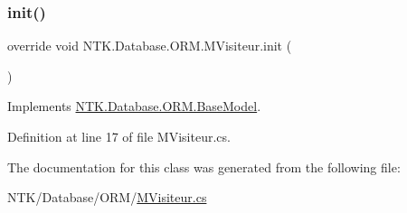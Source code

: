 \subsubsection{\texorpdfstring{init()}{init()}}
{\footnotesize\ttfamily override void N\+T\+K.\+Database.\+O\+R\+M.\+M\+Visiteur.\+init (\begin{DoxyParamCaption}{ }\end{DoxyParamCaption})\hspace{0.3cm}{\ttfamily [virtual]}}







Implements \mbox{\hyperlink{class_n_t_k_1_1_database_1_1_o_r_m_1_1_base_model_a62c00da7e4c99a778e04b0af16dc3938}{N\+T\+K.\+Database.\+O\+R\+M.\+Base\+Model}}.



Definition at line 17 of file M\+Visiteur.\+cs.



The documentation for this class was generated from the following file\+:\begin{DoxyCompactItemize}
\item 
N\+T\+K/\+Database/\+O\+R\+M/\mbox{\hyperlink{_m_visiteur_8cs}{M\+Visiteur.\+cs}}\end{DoxyCompactItemize}
